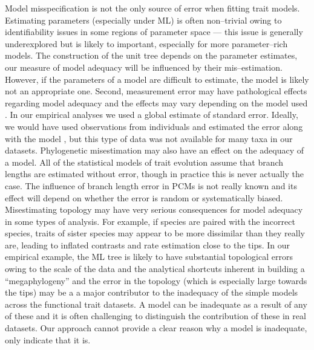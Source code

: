 \documentclass[a4paper,12pt]{article}
\begin{document}
Model misspecification is not the only source of error when fitting trait models. Estimating parameters (especially under ML) is often non--trivial owing to identifiability issues in some regions of parameter space \citep{Ane2008, HoAne2012} --- this issue is generally underexplored but is likely to important, especially for more parameter--rich models. The construction of the unit tree depends on the parameter estimates, our measure of model adequacy  will be influenced by their mis--estimation. However, if the parameters of a model are difficult to estimate, the model is likely not an appropriate one. Second, measurement error may have pathological effects regarding model adequacy and the effects may vary depending on the model used \citep{PennellPE}. In our empirical analyses we used a global estimate of standard error. Ideally, we would have used observations from individuals and estimated the error along with the model \citep{Ives2007, Felsenstein2008, RevellReynolds2012, Hansen2012}, but this type of data was not available for many taxa in our datasets. Phylogenetic misestimation may also have an effect on the adequacy of a model. All of the statistical models of trait evolution assume that branch lengths are estimated without error, though in practice this is never actually the case. The influence of branch length error in PCMs is not really known and its effect will depend on whether the error is random or systematically biased. Misestimating topology may have very serious consequences for model adequacy in some types of analysis. For example, if species are paired with the incorrect species, traits of sister species may appear to be more dissimilar than they really are, leading to inflated contrasts and rate estimation close to the tips. In our empirical example, the ML tree is likely to have substantial topological errors owing to the scale of the data and the analytical shortcuts inherent in building a ``megaphylogeny'' \citep{Smith2009} and the error in the topology (which is especially large towards the tips) may be a a major contributor to the inadequacy of the simple models across the functional trait datasets. 
A model can be inadequate as a result of any of these and it is often challenging to distinguish the contribution of these in real datasets. Our approach cannot provide a clear reason why a model is inadequate, only indicate that it is.
\end{document}
